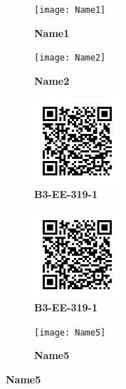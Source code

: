 \documentclass{article}
\begin{document}
	\clearpage
	\begin{figure}[]
		\centering
		\begin{subfigure}{0.19\textwidth}
			\centering
			\texttt{[image: Name1]}
			\caption*{\large{\textbf{Name1}}}
		\end{subfigure}\hfil
		\begin{subfigure}{0.19\textwidth}
			\centering
			\texttt{[image: Name2]}
			\caption*{\large{\textbf{Name2}}}
		\end{subfigure}\hfil
		\begin{subfigure}{0.19\textwidth}
			\centering
			\includegraphics[width = 3.2cm,height = 3.2cm]{B3-EE-319-1}
			\caption*{\large{\textbf{B3-EE-319-1}}}
		\end{subfigure}\hfil
		\begin{subfigure}{0.19\textwidth}
			\centering
			\includegraphics[width = 3.2cm,height = 3.2cm]{B3-EE-319-1}
			\caption*{\large{\textbf{B3-EE-319-1}}}
		\end{subfigure} \hfil
		\begin{subfigure}{0.19\textwidth}
			\centering
			\texttt{[image: Name5]}
			\caption*{\large{\textbf{Name5}}}
		\end{subfigure}\hfil
	\end{figure}
	
\end{document}
